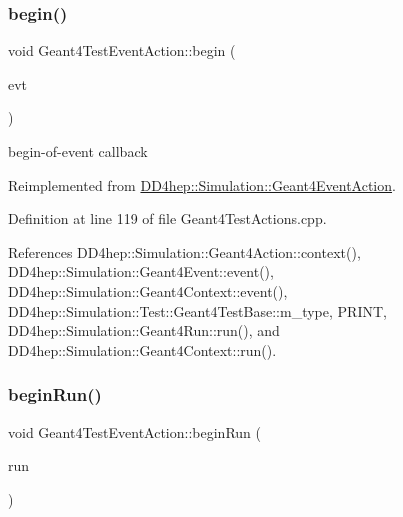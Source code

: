 \subsubsection{\texorpdfstring{begin()}{begin()}}
{\footnotesize\ttfamily void Geant4\+Test\+Event\+Action\+::begin (\begin{DoxyParamCaption}\item[{const G4\+Event $\ast$}]{evt }\end{DoxyParamCaption})\hspace{0.3cm}{\ttfamily [virtual]}}



begin-\/of-\/event callback 



Reimplemented from \hyperlink{class_d_d4hep_1_1_simulation_1_1_geant4_event_action_ad10785d157fa962f4ef2a5361bb0f5da}{D\+D4hep\+::\+Simulation\+::\+Geant4\+Event\+Action}.



Definition at line 119 of file Geant4\+Test\+Actions.\+cpp.



References D\+D4hep\+::\+Simulation\+::\+Geant4\+Action\+::context(), D\+D4hep\+::\+Simulation\+::\+Geant4\+Event\+::event(), D\+D4hep\+::\+Simulation\+::\+Geant4\+Context\+::event(), D\+D4hep\+::\+Simulation\+::\+Test\+::\+Geant4\+Test\+Base\+::m\+\_\+type, P\+R\+I\+NT, D\+D4hep\+::\+Simulation\+::\+Geant4\+Run\+::run(), and D\+D4hep\+::\+Simulation\+::\+Geant4\+Context\+::run().

\hypertarget{class_d_d4hep_1_1_simulation_1_1_test_1_1_geant4_test_event_action_ab8bf5d68032c1a27015c9396eb713c5f}{}\label{class_d_d4hep_1_1_simulation_1_1_test_1_1_geant4_test_event_action_ab8bf5d68032c1a27015c9396eb713c5f} 
\subsubsection{\texorpdfstring{begin\+Run()}{beginRun()}}
{\footnotesize\ttfamily void Geant4\+Test\+Event\+Action\+::begin\+Run (\begin{DoxyParamCaption}\item[{const G4\+Run $\ast$}]{run }\end{DoxyParamCaption})}



